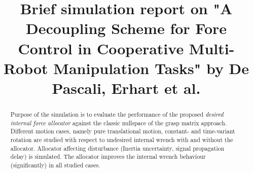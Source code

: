 \documentclass[conference]{IEEEtran}
\begin{document}
%
\title{Brief simulation report on "A Decoupling Scheme for Fore Control in Cooperative Multi-Robot Manipulation Tasks" by De Pascali, Erhart et al.}


\author{

}

\maketitle

\begin{abstract}
Purpose of the simulation is to evaluate the performance of the proposed \textit{desired internal force allocator} against the classic nullspace of the grasp matrix approach. Different motion cases, namely pure translational motion, constant- and time-variant rotation are studied with respect to undesired internal wrench with and without the allocator. Allocator affecting disturbance (Inertia uncertainty, signal propagation delay) is simulated. The allocator improves the internal wrench behaviour (significantly) in all studied cases.  
\end{abstract}
\end{document}
